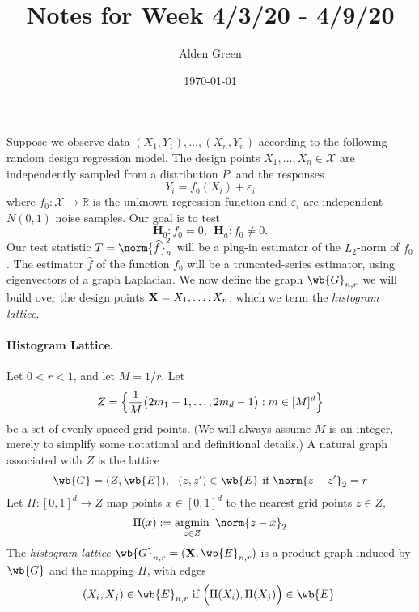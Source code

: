 \documentclass{article}
\newcommand{\Reals}{\mathbb{R}}
\newcommand{\1}{\mathbf{1}}
\DeclareMathOperator*{\argmin}{argmin}
\newcommand{\Xset}{\mathcal{X}}
\newcommand{\Leb}{L}
\newcommand{\wh}[1]{\widehat{#1}}
\theoremstyle{alden}
\theoremstyle{aldenthm}
\theoremstyle{definition}
\theoremstyle{remark}
\begin{document}
\title{Notes for Week 4/3/20 - 4/9/20}
\author{Alden Green}
\date{\today}
\maketitle

Suppose we observe data $(X_1,Y_1),\ldots,(X_n,Y_n)$ according to the following random design regression model. The design points $X_1,\ldots,X_n \in \Xset$ are independently sampled from a distribution $P$, and the responses
\begin{equation*} 
Y_i = f_0(X_i) + \varepsilon_i
\end{equation*}
where $f_0: \Xset \to \Reals$ is the unknown regression function and $\varepsilon_i$ are independent $N(0,1)$ noise samples. Our goal is to test
\begin{equation*}
\mathbf{H}_0: f_0 = 0,~~ \mathbf{H}_a: f_0 \neq 0.
\end{equation*}
Our test statistic $T = \norm{\wh{f}}_n^2$ will be a plug-in estimator of the $\Leb_2$-norm of $f_0$. The estimator $\wh{f}$ of the function $f_0$ will be a truncated-series estimator, using eigenvectors of a graph Laplacian. We now define the graph $\wb{G}_{n,r}$ we will build over the design points ${\bf X} = X_1,\ldots,X_n$, which we term the \emph{histogram lattice}.

\paragraph{Histogram Lattice.}

Let $0 < r < 1$, and let $M = 1/r$. Let
\begin{equation*}
Z = \Bigl\{ \frac{1}{M}\bigl(2m_1 - 1,\ldots,2m_d - 1\bigr): m \in [M]^d \Bigr\}
\end{equation*}
be a set of evenly spaced grid points. (We will always assume $M$ is an integer, merely to simplify some notational and definitional details.) A natural graph associated with $Z$ is the lattice
\begin{equation*}
\wb{G} = (Z,\wb{E}),~~ (z,z') \in \wb{E} ~\textrm{if}~ \norm{z - z'}_2 = r
\end{equation*}
Let $\Pi: [0,1]^d \to Z$ map points $x \in [0,1]^d$ to the nearest grid points $z \in Z$,
\begin{equation*}
\Pi(x) := \argmin_{z \in Z}~ \norm{z - x}_2 
\end{equation*}
The \emph{histogram lattice} $\wb{G}_{n,r} = ({\bf X}, \wb{E}_{n,r})$ is a product graph induced by $\wb{G}$ and the mapping $\Pi$, with edges 
\begin{equation*}
(X_i,X_j) \in \wb{E}_{n,r} ~\textrm{if}~ \Bigl(\Pi(X_i),\Pi(X_j)\Bigr) \in \wb{E}.
\end{equation*}
\end{document}
